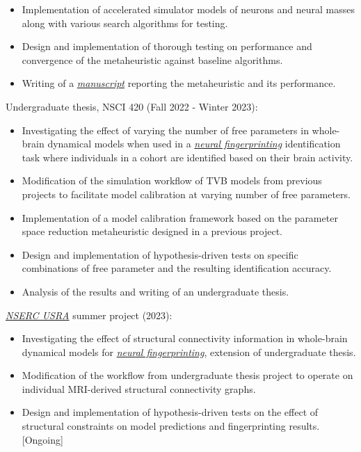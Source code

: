 \documentclass[margin, 10pt]{res} %
\begin{document}
\begin{resume}
\begin{itemize}
			\item Implementation of accelerated simulator models of neurons and neural masses along with various search algorithms for testing. 
			\item Design and implementation of thorough testing on performance and convergence of the metaheuristic against baseline algorithms.
			\item Writing of a \href{https://arxiv.org/abs/2309.16465}{\textit{manuscript}} reporting the metaheuristic and its performance.
		\end{itemize}
		Undergraduate thesis, NSCI 420 (Fall 2022 - Winter 2023):
		\vspace*{0.15cm}
		\begin{itemize} \itemsep -2pt %
			\item[\ding{227}] Investigating the effect of varying the number of free parameters in whole-brain dynamical models when used in a \href{https://www.nature.com/articles/s41467-021-25895-8}{\textit{neural fingerprinting}} identification task where individuals in a cohort are identified based on their brain activity.
			\item Modification of the simulation workflow of TVB models from previous projects to facilitate model calibration at varying number of free parameters.
			\item Implementation of a model calibration framework based on the parameter space reduction metaheuristic designed in a previous project.
			\item Design and implementation of hypothesis-driven tests on specific combinations of free parameter and the resulting identification accuracy. 
			\item Analysis of the results and writing of an undergraduate thesis.
		\end{itemize}
		\vspace{-0.10cm}
		\href{https://www.nserc-crsng.gc.ca/students-etudiants/ug-pc/usra-brpc_eng.asp}{\textit{NSERC USRA}} summer project (2023):
		\vspace*{0.15cm}
		\begin{itemize} \itemsep -2pt %
			\item[\ding{227}] Investigating the effect of structural connectivity information in whole-brain dynamical models for \href{https://www.nature.com/articles/s41467-021-25895-8}{\textit{neural fingerprinting}}, extension of undergraduate thesis.
			\item Modification of the workflow from undergraduate thesis project to operate on individual MRI-derived structural connectivity graphs.
			\item Design and implementation of hypothesis-driven tests on the effect of structural constraints on model predictions and fingerprinting results. [Ongoing]
		\end{itemize}
	

\end{resume}
\end{document}
